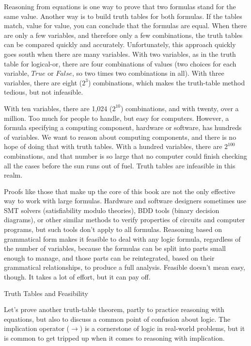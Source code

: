 \begin{aside}
Reasoning from equations is one way to prove that two formulas stand
for the same value.
Another way is to build truth tables for both formulas.
If the tables match, value for value, you can conclude that
the formulas are equal.
When there are only a few variables, and therefore only a few combinations,
the truth tables can be compared quickly and accurately.
Unfortunately, this approach quickly goes south when there are many variables.
With two variables, as in the truth table
for logical-or, there are four combinations of values
(two choices for each variable, $True$ or $False$, so two times two
combinations in all). With three variables, there are eight
($2^3$) combinations, which makes the truth-table method tedious,
but not infeasible.

With ten variables, there are 1,024 ($2^{10}$) combinations,
and with twenty, over a million.
Too much for people to handle, but easy for computers.
However, a formula specifying a computing component,
hardware or software, has hundreds of variables.
We want to reason about computing components,
and there is no hope of doing that with truth tables.
With a hundred variables, there are $2^{100}$ combinations,
and that number is so large that no computer could
finish checking all the cases before the sun runs out of fuel.
Truth tables are infeasible in this realm.

Proofs like those that make up the core of this book
are not the only effective way to work with large formulas.
Hardware and software designers sometimes use
SMT solvers (satisfiability modulo theories),
BDD tools (binary decision diagrams), or other similar methods
to verify properties of circuits and computer programs,
but such tools don't apply to all formulas.
Reasoning based on grammatical form
makes it feasible to deal with any logic formula,
regardless of the number of variables,
because the formulas can be split into parts small enough
to manage, and those parts can be reintegrated, based on
their grammatical relationships, to produce a full analysis.
Feasible doesn't mean easy, though.
It takes a lot of effort, but it can pay off.
\caption{Truth Tables and Feasibility}
\label{feasibility}
\end{aside}

Let's prove another truth-table theorem, partly to practice
reasoning with equations, but also to discuss a common
point of confusion about logic. The implication operator
($\rightarrow$) is a cornerstone of logic in real-world problems,
but it is common to get tripped up when it comes to
reasoning with implication.

